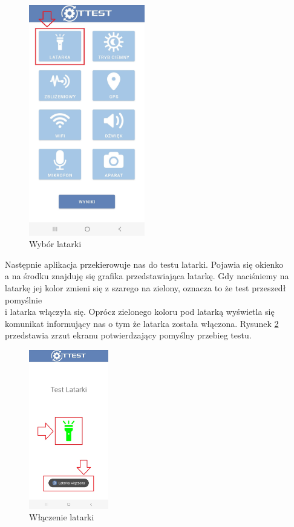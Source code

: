 \begin{figure}[!hbt]
	\begin{center}
		\includegraphics[angle=360, width=0.45\textwidth]{rys/punkt6/latarka1.jpg}
		\caption{Wybór latarki}
		\label{rys:latarka1}
	\end{center}
\end{figure}

Następnie aplikacja przekierowuje nas do testu latarki. Pojawia się okienko \\ a na środku znajduję się grafika przedstawiająca latarkę.
Gdy naciśniemy na latarkę jej kolor zmieni się z szarego na zielony, oznacza to że test przeszedł pomyślnie \\ i latarka włączyła się. Oprócz zielonego koloru pod latarką wyświetla się komunikat informujący nas o tym że latarka została włączona. Rysunek \ref{rys:latarka2} przedstawia zrzut ekranu potwierdzający pomyślny przebieg testu.
\newpage


\begin{figure}[!hbt]
	\begin{center}
		\includegraphics[angle=360, width=0.31\textwidth]{rys/punkt6/latarka2.jpg}
		\caption{Włączenie latarki}
		\label{rys:latarka2}
	\end{center}
\end{figure}

